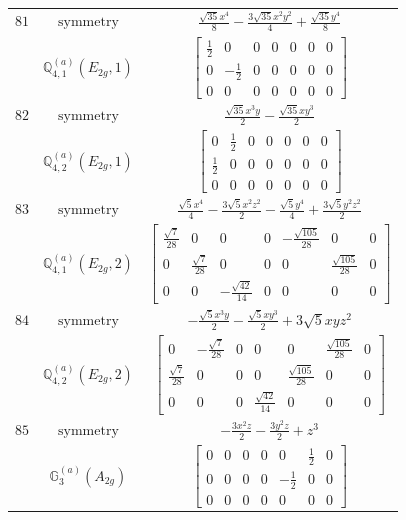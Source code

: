 \documentclass[fleqn,8pt,landscape]{jsarticle}
\begin{document}
\begin{longtable}{ccc}
$ 81 $ & $ \text{symmetry} $ & $ \frac{\sqrt{35} x^{4}}{8} - \frac{3 \sqrt{35} x^{2} y^{2}}{4} + \frac{\sqrt{35} y^{4}}{8} $ \\
$  $ & $ \mathbb{Q}_{4,1}^{(a)}(E_{2g},1) $ & $ \begin{bmatrix} \frac{1}{2} & 0 & 0 & 0 & 0 & 0 & 0 \\ 0 & - \frac{1}{2} & 0 & 0 & 0 & 0 & 0 \\ 0 & 0 & 0 & 0 & 0 & 0 & 0 \end{bmatrix} $ \\ \hline
$ 82 $ & $ \text{symmetry} $ & $ \frac{\sqrt{35} x^{3} y}{2} - \frac{\sqrt{35} x y^{3}}{2} $ \\
$  $ & $ \mathbb{Q}_{4,2}^{(a)}(E_{2g},1) $ & $ \begin{bmatrix} 0 & \frac{1}{2} & 0 & 0 & 0 & 0 & 0 \\ \frac{1}{2} & 0 & 0 & 0 & 0 & 0 & 0 \\ 0 & 0 & 0 & 0 & 0 & 0 & 0 \end{bmatrix} $ \\ \hline
$ 83 $ & $ \text{symmetry} $ & $ \frac{\sqrt{5} x^{4}}{4} - \frac{3 \sqrt{5} x^{2} z^{2}}{2} - \frac{\sqrt{5} y^{4}}{4} + \frac{3 \sqrt{5} y^{2} z^{2}}{2} $ \\
$  $ & $ \mathbb{Q}_{4,1}^{(a)}(E_{2g},2) $ & $ \begin{bmatrix} \frac{\sqrt{7}}{28} & 0 & 0 & 0 & - \frac{\sqrt{105}}{28} & 0 & 0 \\ 0 & \frac{\sqrt{7}}{28} & 0 & 0 & 0 & \frac{\sqrt{105}}{28} & 0 \\ 0 & 0 & - \frac{\sqrt{42}}{14} & 0 & 0 & 0 & 0 \end{bmatrix} $ \\ \hline
$ 84 $ & $ \text{symmetry} $ & $ - \frac{\sqrt{5} x^{3} y}{2} - \frac{\sqrt{5} x y^{3}}{2} + 3 \sqrt{5} x y z^{2} $ \\
$  $ & $ \mathbb{Q}_{4,2}^{(a)}(E_{2g},2) $ & $ \begin{bmatrix} 0 & - \frac{\sqrt{7}}{28} & 0 & 0 & 0 & \frac{\sqrt{105}}{28} & 0 \\ \frac{\sqrt{7}}{28} & 0 & 0 & 0 & \frac{\sqrt{105}}{28} & 0 & 0 \\ 0 & 0 & 0 & \frac{\sqrt{42}}{14} & 0 & 0 & 0 \end{bmatrix} $ \\ \hline
$ 85 $ & $ \text{symmetry} $ & $ - \frac{3 x^{2} z}{2} - \frac{3 y^{2} z}{2} + z^{3} $ \\
$  $ & $ \mathbb{G}_{3}^{(a)}(A_{2g}) $ & $ \begin{bmatrix} 0 & 0 & 0 & 0 & 0 & \frac{1}{2} & 0 \\ 0 & 0 & 0 & 0 & - \frac{1}{2} & 0 & 0 \\ 0 & 0 & 0 & 0 & 0 & 0 & 0 \end{bmatrix} $ \\ \hline

\end{longtable}
\end{document}
